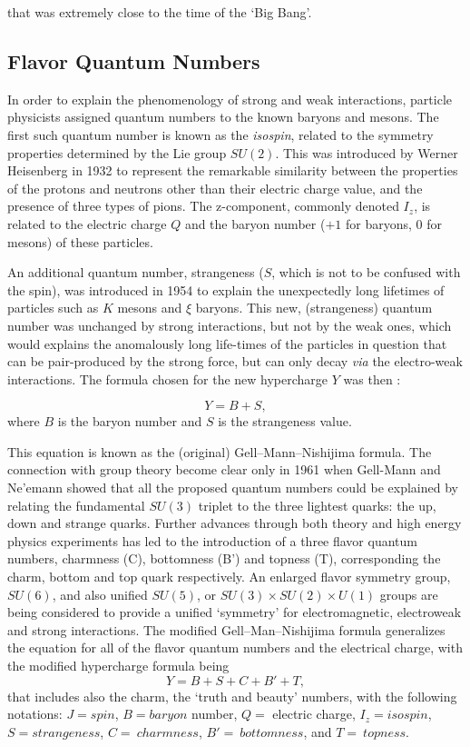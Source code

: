 \documentclass[12pt]{article}
\theoremstyle{plain}
\theoremstyle{definition}
\numberwithin{equation}{section}
\begin{document}
 that was extremely close to the time of the `Big Bang'.

\subsection{Flavor Quantum Numbers}
In order to explain the phenomenology of strong and weak interactions, particle physicists assigned quantum numbers to the known baryons and mesons. The first such quantum number is known as the {\em isospin}, related to the symmetry properties determined by the Lie group $SU(2)$. This was introduced by Werner Heisenberg in 1932 to represent the remarkable similarity between the properties of the protons and neutrons other than their electric charge value, and the presence of three types of pions. The z-component, commonly denoted $I_z$, is related to the electric charge $Q$ and the baryon number ($+1$ for baryons, $0$ for mesons) of these particles.
 
 An additional quantum number, strangeness ($S$, which is not to be confused with the spin), was introduced in 1954 to explain the unexpectedly long lifetimes of particles such as $K$ mesons and $\xi$ baryons. This new, (strangeness) quantum number was unchanged by strong interactions, but not by the weak ones, which would explains the anomalously long life-times of the particles in question that can be pair-produced by the strong force, but can  only decay {\em via} the electro-weak interactions. The formula chosen for the new hypercharge $Y$ was then : 

$$Y = B + S,$$
where $B$ is the baryon number and $S$ is the strangeness value.

 This equation is known as the (original) Gell--Mann--Nishijima formula. The connection with group theory become clear only in 1961 when Gell-Mann and Ne'emann showed that all the proposed quantum numbers could be explained by relating the fundamental $SU(3)$ triplet to the three lightest quarks: the up, down and strange quarks. Further advances through both theory and high energy physics experiments has led to the introduction of a three flavor quantum numbers, charmness (C), bottomness (B') and topness (T), corresponding the charm, bottom and top quark respectively.  An enlarged flavor symmetry group, $SU(6)$, and also unified $SU(5)$, or $SU(3) \times SU(2) \times U(1)$
groups are being considered to provide a unified `symmetry' for electromagnetic, electroweak and strong interactions. The modified 
Gell--Man--Nishijima formula generalizes the equation for all of the flavor quantum numbers and the electrical charge, with the modified hypercharge formula being 
$$Y = B + S + C + B' + T,$$ 
that includes also the charm, the `truth and beauty' numbers, with the following notations:
$J = spin $, $B = baryon$ number, $Q= $ electric charge, $I_z = isospin$, 
$S = strangeness$, $C =~ charmness$, $B' = ~ bottomness$, and 
$T = ~ topness$.
\end{document}
